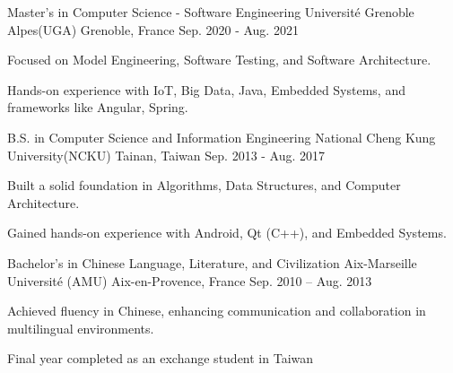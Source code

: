 

\begin{cventries}

  \cventry
    {Master's in Computer Science - Software Engineering} %
    {Université Grenoble Alpes(UGA)} %
    {Grenoble, France} %
    {Sep. 2020 - Aug. 2021} %
    {
      \begin{cvitems} %
        \item {Focused on Model Engineering, Software Testing, and Software Architecture.}
        \item {Hands-on experience with IoT, Big Data, Java, Embedded Systems, and frameworks like Angular, Spring.}
      \end{cvitems}
    }

  \cventry
    {B.S. in Computer Science and Information Engineering} %
    {National Cheng Kung University(NCKU)} %
    {Tainan, Taiwan} %
    {Sep. 2013 - Aug. 2017} %
    {
      \begin{cvitems} %
        \item {Built a solid foundation in Algorithms, Data Structures, and Computer Architecture.}
        \item {Gained hands-on experience with Android, Qt (C++), and Embedded Systems.}
      \end{cvitems}
    }
  \cventry
    {Bachelor's in Chinese Language, Literature, and Civilization} %
    {Aix-Marseille Université (AMU)} %
    {Aix-en-Provence, France} %
    {Sep. 2010 – Aug. 2013} %
    {
      \begin{cvitems} %
        \item {Achieved fluency in Chinese, enhancing communication and collaboration in multilingual environments.}
        \item {Final year completed as an exchange student in Taiwan}
      \end{cvitems}
    }



\end{cventries}
